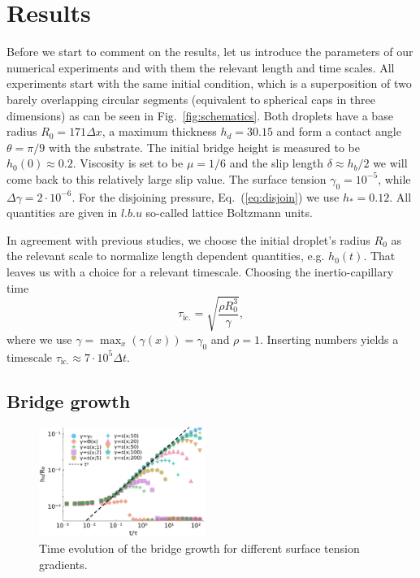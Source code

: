 \documentclass[twocolumn,amsmath,amssymb,showpacs,pre,nofootinbib,superscriptaddress]{revtex4-1} %
\begin{document}
\section{Results}\label{sec:results}
Before we start to comment on the results, let us introduce the parameters of our numerical experiments and with them the relevant length and time scales.
All experiments start with the same initial condition, which is a superposition of two barely overlapping circular segments (equivalent to spherical caps in three dimensions) as can be seen in Fig.~\ref{fig:schematics}. 
Both droplets have a base radius $R_0 = 171\Delta x$, a maximum thickness $h_d = 30.15$ and form a contact angle $\theta = \pi/9$ with the substrate.
The initial bridge height is measured to be $h_0(0) \approx 0.2$.
Viscosity is set to be $\mu = 1/6$ and the slip length $\delta \approx h_b/2$ we will come back to this relatively large slip value.
The surface tension $\gamma_0 = 10^{-5}$, while $\Delta\gamma = 2\cdot 10^{-6}$.
For the disjoining pressure, Eq.~(\ref{eq:disjoin}) we use $h_{\ast} = 0.12$.
All quantities are given in $l.b.u$ so-called lattice Boltzmann units.

In agreement with previous studies, we choose the initial droplet's radius $R_0$ as the relevant scale to normalize length dependent quantities, e.g. $h_0(t)$.
That leaves us with a choice for a relevant timescale.
Choosing the inertio-capillary time 
\begin{equation}\label{eq:inertio-cap-time}
    \tau_{\text{ic.}} = \sqrt{\frac{\rho R_0^3}{\gamma}},
\end{equation}
where we use $\gamma = \max_x(\gamma(x)) = \gamma_0$ and $\rho = 1$.
Inserting numbers yields a timescale $\tau_{\text{ic.}} \approx 7\cdot 10^5 \Delta t$. 

\subsection{Bridge growth}\label{subsec:growth}
\begin{figure}
    \centering
    \includegraphics[width=0.48\textwidth]{Figures/bridge_evo_all.pdf}
    \caption{Time evolution of the bridge growth for different surface tension gradients.}
    \label{fig:bridge_growth}
\end{figure}
\end{document}
